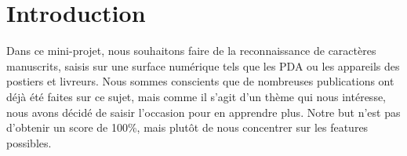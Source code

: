 \chapter{Introduction}

Dans ce mini-projet, nous souhaitons faire de la reconnaissance de caractères manuscrits, saisis sur une surface numérique tels que les PDA ou les appareils des postiers et livreurs. Nous sommes conscients que de nombreuses publications ont déjà été faites sur ce sujet, mais comme il s'agit d'un thème qui nous intéresse, nous avons décidé de saisir l'occasion pour en apprendre plus. Notre but n'est pas d'obtenir un score de 100\%, mais plutôt de nous concentrer sur les features possibles.
